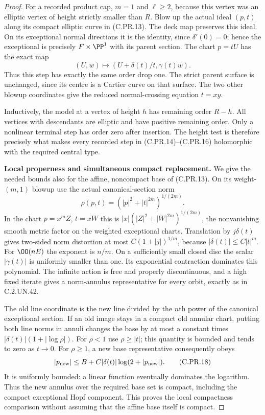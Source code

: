 \begin{proof}
For a recorded product cap, $m=1$ and $\ell\ge2$, because this
vertex was an elliptic vertex of height strictly smaller than $R$.
Blow up the actual ideal $(p,t)$ along its compact elliptic
curve in (C.PR.13). The deck map preserves this ideal.
On its exceptional normal directions it is the identity,
since $\delta'(0)=0$; hence the exceptional is precisely
$F\times\PP^1$ with its parent section. The chart $p=tU$
has the exact map
\[
                    (U,w)\longmapsto
          (U+\delta(t)/t,\gamma(t)w).                   \tag{C.PR.16}
\]
Thus this step has exactly the same order drop one. The strict
parent surface is unchanged, since its centre is a Cartier
curve on that surface. The two other blowup coordinates give
the reduced normal-crossing equation $t=xy$.

Inductively, the model at a vertex of height $h$ has remaining
order $R-h$. All vertices with descendants are elliptic and
have positive remaining order. Only a nonlinear terminal step
has order zero after insertion. The height test is therefore
precisely what makes every recorded step in (C.PR.14)--(C.PR.16)
holomorphic with the required central type.

\par\medskip\noindent\textbf{Local properness and simultaneous compact replacement.}
We give the needed bounds also for the affine, noncompact base
of (C.PR.13). On its weight-$(m,1)$ blowup use the actual
canonical-section norm
\[
                  \rho(p,t)=
                  (|p|^2+|t|^{2m})^{1/(2m)}.           \tag{C.PR.17}
\]
In the chart $p=x^mZ$, $t=xW$ this is
$|x|(|Z|^2+|W|^{2m})^{1/(2m)}$, the nonvanishing smooth
metric factor on the weighted exceptional charts. Translation
by $j\delta(t)$ gives two-sided norm distortion at most
$C(1+|j|)^{1/m}$, because $|\delta(t)|\le C|t|^m$.
For $\OO(nE)$ the exponent is $n/m$. On a sufficiently small
closed disc the scalar $|\gamma(t)|$ is uniformly smaller
than one. Its exponential contraction dominates this polynomial.
The infinite action is free and properly discontinuous, and
a high fixed iterate gives a norm-annulus representative for
every orbit, exactly as in C.2.UN.42.

The old line coordinate is the new line divided by the $n$th
power of the canonical exceptional section. If an old image
stays in a compact old annular chart, putting both line norms
in annuli changes the base by at most a constant times
$|\delta(t)|(1+|\log\rho|)$. For $\rho<1$ use $\rho\ge|t|$;
this quantity is bounded and tends to zero as $t\to0$.
For $\rho\ge1$, a new base representative consequently obeys
\[
 |p_{\rm new}|\le B+C|\delta(t)|\log(2+|p_{\rm new}|).
                                                        \tag{C.PR.18}
\]
It is uniformly bounded: a linear function eventually dominates
the logarithm. Thus the new annulus over the required base set
is compact, including the compact exceptional Hopf component.
This proves the local compactness comparison without assuming
that the affine base itself is compact.


\end{proof}

